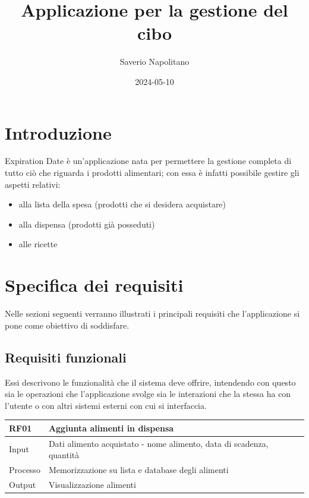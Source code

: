 \documentclass{article}
\title{Applicazione per la gestione del cibo}
\date{2024-05-10}
\author{Saverio Napolitano}
\begin{document}
\maketitle


\tableofcontents

\newpage


\section{Introduzione}

Expiration Date è un'applicazione nata per permettere la gestione completa di tutto ciò che riguarda i prodotti alimentari; con essa è infatti possibile gestire gli aspetti relativi:
\begin{itemize}

  \item alla lista della spesa (prodotti che si desidera acquistare)
  \item alla dispensa (prodotti già posseduti)
  \item alle ricette
  
\end{itemize}

\section{Specifica dei requisiti}

Nelle sezioni seguenti verranno illustrati i principali requisiti che l'applicazione si pone come obiettivo di soddisfare.

\subsection{Requisiti funzionali}

Essi descrivono le funzionalità che il sistema deve offrire, intendendo con questo sia le operazioni che l'applicazione svolge sia le interazioni che la stessa ha con l'utente o con altri sistemi esterni con cui si interfaccia.

\begin{table}[H]
    \begin{flushleft}
      \begin{tabular}{l|l}
        \toprule
        \textbf{RF01} & \textbf{Aggiunta alimenti in dispensa}\\
        \midrule
        Input & Dati alimento acquistato - nome alimento, data di scadenza, quantità\\
        Processo & Memorizzazione su lista e database degli alimenti\\
        Output & Visualizzazione alimenti\\
        \bottomrule
      \end{tabular}
    \end{flushleft}
\end{table}
\end{document}
